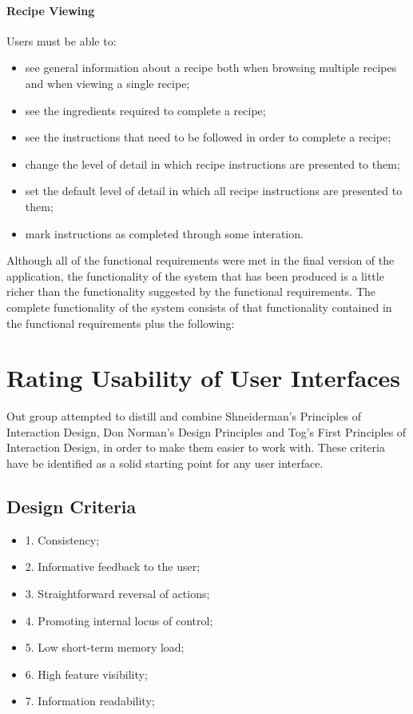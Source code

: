 \paragraph{Recipe Viewing}
Users must be able to:
\begin{itemize}
\item see general information about a recipe both when browsing multiple recipes and when viewing a single recipe;
\item see the ingredients required to complete a recipe;
\item see the instructions that need to be followed in order to complete a recipe;
\item change the level of detail in which recipe instructions are presented to them;
\item set the default level of detail in which all recipe instructions are presented to them;
\item mark instructions as completed through some interation.
\end{itemize}

Although all of the functional requirements were met in the final version of the application, the functionality of the system that has been produced is a little richer than the functionality suggested by the functional requirements. The complete functionality of the system consists of that functionality contained in the functional requirements plus the following: 

\section*{Rating Usability of User Interfaces}
Out group attempted to distill and combine Shneiderman's Principles of Interaction Design, Don Norman's Design Principles and Tog's First Principles of Interaction Design, in order to make them easier to work with. These criteria have be identified as a solid starting point for any user interface.

\subsection*{Design Criteria}
\begin{itemize}
\item 1. Consistency;
\item 2. Informative feedback to the user;
\item 3. Straightforward reversal of actions;
\item 4. Promoting internal locus of control;
\item 5. Low short-term memory load;
\item 6. High feature visibility;
\item 7. Information readability;
\end{itemize}

